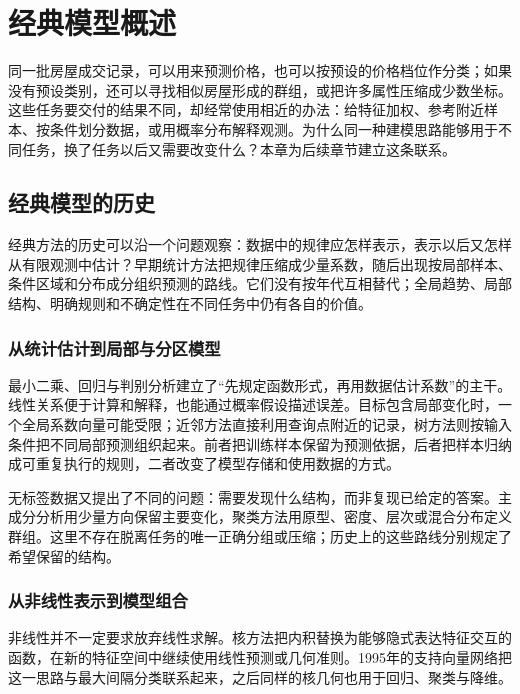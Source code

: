 \chapter{经典模型概述}
\label{chap:classic-models-overview}

同一批房屋成交记录，可以用来预测价格，也可以按预设的价格档位作分类；如果没有预设类别，还可以寻找相似房屋形成的群组，或把许多属性压缩成少数坐标。这些任务要交付的结果不同，却经常使用相近的办法：给特征加权、参考附近样本、按条件划分数据，或用概率分布解释观测。为什么同一种建模思路能够用于不同任务，换了任务以后又需要改变什么？本章为后续章节建立这条联系。

\section{经典模型的历史}
\label{sec:classic-overview-history}

经典方法的历史可以沿一个问题观察：数据中的规律应怎样表示，表示以后又怎样从有限观测中估计？早期统计方法把规律压缩成少量系数，随后出现按局部样本、条件区域和分布成分组织预测的路线。它们没有按年代互相替代；全局趋势、局部结构、明确规则和不确定性在不同任务中仍有各自的价值。

\subsection{从统计估计到局部与分区模型}
\label{sec:classic-history-statistical}

最小二乘、回归与判别分析建立了“先规定函数形式，再用数据估计系数”的主干。线性关系便于计算和解释，也能通过概率假设描述误差。目标包含局部变化时，一个全局系数向量可能受限；近邻方法直接利用查询点附近的记录，树方法则按输入条件把不同局部预测组织起来。前者把训练样本保留为预测依据，后者把样本归纳成可重复执行的规则，二者改变了模型存储和使用数据的方式。

无标签数据又提出了不同的问题：需要发现什么结构，而非复现已给定的答案。主成分分析用少量方向保留主要变化，聚类方法用原型、密度、层次或混合分布定义群组。这里不存在脱离任务的唯一正确分组或压缩；历史上的这些路线分别规定了希望保留的结构。

\subsection{从非线性表示到模型组合}
\label{sec:classic-history-kernel-ensemble}

非线性并不一定要求放弃线性求解。核方法把内积替换为能够隐式表达特征交互的函数，在新的特征空间中继续使用线性预测或几何准则。1995年的支持向量网络把这一思路与最大间隔分类联系起来，之后同样的核几何也用于回归、聚类与降维。

